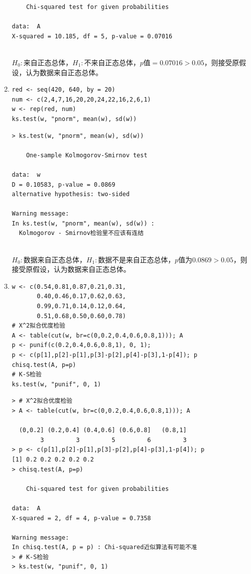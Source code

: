 \begin{enumerate}
\begin{lstlisting}
	Chi-squared test for given probabilities

data:  A
X-squared = 10.185, df = 5, p-value = 0.07016
\end{lstlisting}
        \summary\\
        $H_0:$来自正态总体，$H_1:$不来自正态总体，$p$值$= 0.07016 > 0.05$，则接受原假设，认为数据来自正态总体。
        \item
        \code
\begin{lstlisting}
red <- seq(420, 640, by = 20)
num <- c(2,4,7,16,20,20,24,22,16,2,6,1)
w <- rep(red, num)
ks.test(w, "pnorm", mean(w), sd(w))
\end{lstlisting}
        \out
\begin{lstlisting}
> ks.test(w, "pnorm", mean(w), sd(w))

	One-sample Kolmogorov-Smirnov test

data:  w
D = 0.10583, p-value = 0.0869
alternative hypothesis: two-sided

Warning message:
In ks.test(w, "pnorm", mean(w), sd(w)) :
  Kolmogorov - Smirnov检验里不应该有连结
\end{lstlisting}
        \summary\\
        $H_0:$数据来自正态总体，$H_1:$数据不是来自正态总体，$p$值为$0.0869>0.05$，则接受原假设，认为数据来自正态总体。
        \item
        \code
\begin{lstlisting}
w <- c(0.54,0.81,0.87,0.21,0.31,
       0.40,0.46,0.17,0.62,0.63,
       0.99,0.71,0.14,0.12,0.64,
       0.51,0.68,0.50,0.60,0.78)
# X^2拟合优度检验
A <- table(cut(w, br=c(0,0.2,0.4,0.6,0.8,1))); A
p <- punif(c(0.2,0.4,0.6,0.8,1), 0, 1);
p <- c(p[1],p[2]-p[1],p[3]-p[2],p[4]-p[3],1-p[4]); p
chisq.test(A, p=p)
# K-S检验
ks.test(w, "punif", 0, 1)
\end{lstlisting}
        \out
\begin{lstlisting}
> # X^2拟合优度检验
> A <- table(cut(w, br=c(0,0.2,0.4,0.6,0.8,1))); A

  (0,0.2] (0.2,0.4] (0.4,0.6] (0.6,0.8]   (0.8,1] 
        3         3         5         6         3 
> p <- c(p[1],p[2]-p[1],p[3]-p[2],p[4]-p[3],1-p[4]); p
[1] 0.2 0.2 0.2 0.2 0.2
> chisq.test(A, p=p)

	Chi-squared test for given probabilities

data:  A
X-squared = 2, df = 4, p-value = 0.7358

Warning message:
In chisq.test(A, p = p) : Chi-squared近似算法有可能不准
> # K-S检验
> ks.test(w, "punif", 0, 1)


\end{lstlisting}
\end{enumerate}
